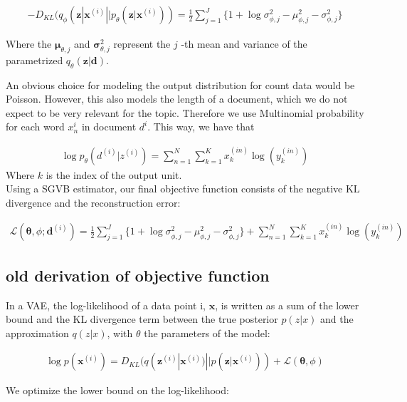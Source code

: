 \documentclass{report}
\begin{document}
\begin{align}
- D_{KL}(q_\phi (\mathbf{z}| \mathbf{x}^{(i)}||p_\theta (\mathbf{z}| \mathbf{x}^{(i)})) = \frac{1}{2}\sum\limits_{j=1}^{J}\{1+\log \sigma_{\phi ,j}^2 - \mu_{\phi,j}^2 - \sigma_{\phi ,j}^2\}
\end{align}

Where the $\mathbf{\mu}_{\theta,j}$ and $\mathbf{\sigma}_{\theta,j}^2$ represent the $j$ -th mean and variance of the parametrized $q_\theta(\mathbf{z}|\mathbf{d})$.

An obvious choice for modeling the output distribution for count data would be Poisson. However, this also models the length of a document, which we do not expect to be very relevant for the topic. Therefore we use Multinomial probability for each word $x_n^{i}$ in document $d^{i}$. This way, we have that

\begin{align}
\log p_{\theta}(d^{(i)}|z^{(i)}) = 
\sum_{n=1}^N
\sum_{k=1}^K x_k^{(in)} \log (y_k^{(in)})
\end{align}
Where $k$ is the index of the output unit.\\


Using a SGVB estimator, our final objective function consists of the negative KL divergence and the reconstruction error:

\begin{align}
\mathcal{L}(\mathbf{\theta}, \phi; \mathbf{d}^{(i)}) = \frac{1}{2}\sum\limits_{j=1}^{J}\{1+\log \sigma_{\phi ,j}^2 - \mu_{\phi,j}^2 - \sigma_{\phi ,j}^2\} 
+ \sum_{n=1}^N
\sum_{k=1}^K x_k^{(in)} \log (y_k^{(in)})
\end{align}

\subsection{old derivation of objective function}

In a VAE, the log-likelihood of a data point i, $\mathbf{x}$, is written as a sum of the lower bound and the KL divergence term between the true posterior $p(z|x)$ and the approximation $q(z|x)$, with $\theta$ the parameters of the model:

\begin{align*}
\log p(\mathbf{x}^{(i)}) = D_{KL}(q(\mathbf{z}^{(i)}|\mathbf{x}^{(i)}) || p(\mathbf{z}|\mathbf{x}^{(i)})) + \mathcal{L}(\mathbf{\theta}, \phi)
\end{align*}

We optimize the lower bound on the log-likelihood: 
\end{document}
